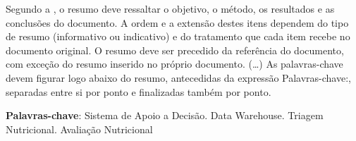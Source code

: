\setlength{\absparsep}{18pt} %
\begin{resumo}
 
Segundo a , o resumo deve ressaltar o objetivo, o método, os resultados e as conclusões do documento. A ordem e a extensão destes itens dependem do tipo de resumo (informativo ou indicativo) e do tratamento que cada item recebe no documento original. O resumo deve ser precedido da referência do documento, com exceção do resumo inserido no próprio documento. (\ldots) As palavras-chave devem figurar logo abaixo do resumo, antecedidas da expressão Palavras-chave:, separadas entre si por ponto e finalizadas também por ponto.

 \textbf{Palavras-chave}: Sistema de Apoio a Decisão. Data Warehouse. Triagem Nutricional. Avaliação Nutricional
\end{resumo}